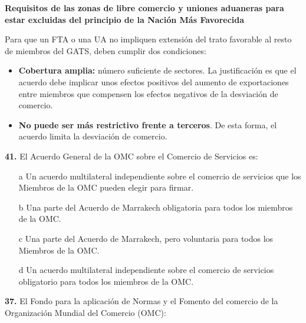 \documentclass{nuevotema}
\begin{document}
\conceptos

\textbf{Requisitos de las zonas de libre comercio y uniones aduaneras para estar excluidas del principio de la Nación Más Favorecida}

Para que un FTA o una UA no impliquen extensión del trato favorable al resto de miembros del GATS, deben cumplir dos condiciones:
\begin{itemize}
	\item \textbf{Cobertura amplia:} número suficiente de sectores. La justificación es que el acuerdo debe implicar unos efectos positivos del aumento de exportaciones entre miembros que compensen los efectos negativos de la desviación de comercio.
	\item \textbf{No puede ser más restrictivo frente a terceros}. De esta forma, el acuerdo limita la desviación de comercio.
\end{itemize}

\preguntas


\textbf{41.} El Acuerdo General de la OMC sobre el Comercio de Servicios es:

\begin{itemize}
	\item[a] Un acuerdo multilateral independiente sobre el comercio de servicios que los Miembros de la OMC pueden elegir para firmar.
	\item[b] Una parte del Acuerdo de Marrakech obligatoria para todos los miembros de la OMC.
	\item[c] Una parte del Acuerdo de Marrakech, pero voluntaria para todos los Miembros de la OMC.
	\item[d] Un acuerdo multilateral independiente sobre el comercio de servicios obligatorio para todos los miembros de la OMC.
\end{itemize}


\textbf{37.} El Fondo para la aplicación de Normas y el Fomento del comercio de la Organización Mundial del Comercio (OMC):
\end{document}
